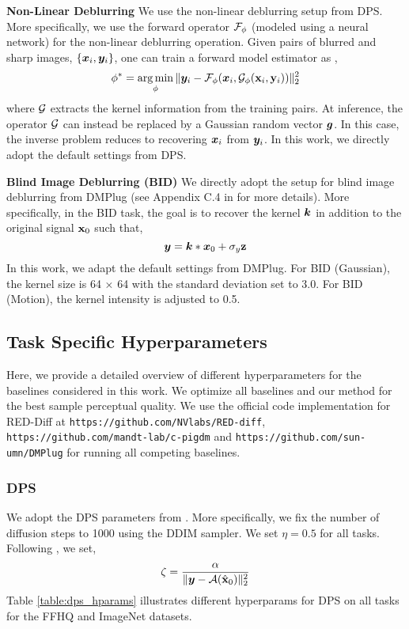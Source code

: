 \textbf{Non-Linear Deblurring} We use the non-linear deblurring setup from DPS. More specifically, we use the forward operator ${\mathcal{F}}_\phi$ (modeled using a neural network) for the non-linear deblurring operation. Given pairs of blurred and sharp images, $\{{\bm{x}}_i, {\bm{y}}_i\}$, one can train a forward model estimator as \citep{Tran_2021_CVPR},
\begin{equation}
    \phi^* = \operatorname*{arg\,min}_\phi \Vert {\bm{y}}_i - {\mathcal{F}}_\phi({\bm{x}}_i, {\mathcal{G}}_\phi({\mathbf{x}}_i, {\mathbf{y}}_i)) \Vert_2^2
\end{equation}
where ${\mathcal{G}}$ extracts the kernel information from the training pairs. At inference, the operator ${\mathcal{G}}$ can instead be replaced by a Gaussian random vector ${\bm{g}}$. In this case, the inverse problem reduces to recovering ${\bm{x}}_i$ from ${\bm{y}}_i$. In this work, we directly adopt the default settings from DPS.

\textbf{Blind Image Deblurring (BID)} We directly adopt the setup for blind image deblurring from DMPlug (see Appendix C.4 in \citet{dmplug} for more details). More specifically, in the BID task, the goal is to recover the kernel ${\bm{k}}$ in addition to the original signal ${\mathbf{x}}_0$ such that,
\begin{equation}
    {\bm{y}} = {\bm{k}} * {\bm{x}}_0 + \sigma_y{\mathbf{z}}
\end{equation}
In this work, we adapt the default settings from DMPlug. For BID (Gaussian), the kernel size is 64 × 64 with the standard deviation set to 3.0. For BID (Motion), the kernel intensity is adjusted to 0.5.

\subsection{Task Specific Hyperparameters}
Here, we provide a detailed overview of different hyperparameters for the baselines considered in this work. We optimize all baselines and our method for the best sample perceptual quality. We use the official code implementation for RED-Diff \citep{mardani2023variational} at \texttt{https://github.com/NVlabs/RED-diff}, \texttt{https://github.com/mandt-lab/c-pigdm} and \texttt{https://github.com/sun-umn/DMPlug} for running all competing baselines.

\subsubsection{DPS \citep{chung2022diffusion}} 
We adopt the DPS parameters from \citet{mardani2023variational}. More specifically, we fix the number of diffusion steps to 1000 using the DDIM sampler. We set $\eta=0.5$ for all tasks. Following \citet{chung2022diffusion}, we set,
\begin{equation}
    \zeta = \frac{\alpha}{\Vert{\bm{y}} - {\mathcal{A}}(\hat{{\mathbf{x}}}_0)\Vert_2^2}
\end{equation}
Table \ref{table:dps_hparams} illustrates different hyperparams for DPS on all tasks for the FFHQ and ImageNet datasets. 

